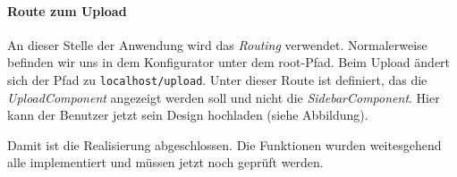 \paragraph{Route zum Upload}
An dieser Stelle der Anwendung wird das \textit{Routing} verwendet. Normalerweise befinden wir uns in dem Konfigurator unter dem root-Pfad. Beim Upload ändert sich der Pfad zu \texttt{localhost/upload}. Unter dieser Route ist definiert, das die \textit{UploadComponent} angezeigt werden soll und nicht die \textit{SidebarComponent}. Hier kann der Benutzer jetzt sein Design hochladen (siehe Abbildung).


Damit ist die Realisierung abgeschlossen. Die Funktionen wurden weitesgehend alle implementiert und müssen jetzt noch geprüft werden.